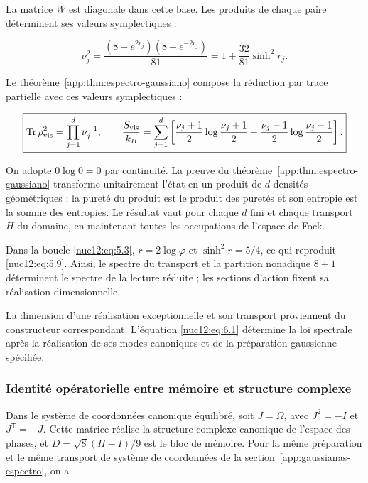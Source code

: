 La matrice \(W\) est diagonale dans cette base. Les produits de chaque paire déterminent ses valeurs symplectiques :




\begin{equation}
\boxed{\nu_j^2=
\frac{(8+e^{2r_j})(8+e^{-2r_j})}{81}
=1+\frac{32}{81}\sinh^2r_j.}
\label{nuc12:eq:6.1}
\end{equation}



Le théorème~\ref{app:thm:espectro-gaussiano} compose la réduction par trace partielle avec ces valeurs symplectiques :



\begin{equation}
\boxed{\operatorname{Tr}\rho_{\rm vis}^2=\prod_{j=1}^d\nu_j^{-1},
\qquad
\frac{S_{\rm vis}}{k_B}=\sum_{j=1}^d
\left[\frac{\nu_j+1}{2}\log\frac{\nu_j+1}{2}
-\frac{\nu_j-1}{2}\log\frac{\nu_j-1}{2}\right].}
\label{nuc12:eq:6.2}
\end{equation}



On adopte \(0\log0=0\) par continuité. La preuve du théorème~\ref{app:thm:espectro-gaussiano} transforme unitairement l’état en un produit de \(d\) densités géométriques : la pureté du produit est le produit des puretés et son entropie est la somme des entropies. Le résultat vaut pour chaque \(d\) fini et chaque transport \(H\) du domaine, en maintenant toutes les occupations de l’espace de Fock.

Dans la boucle \eqref{nuc12:eq:5.3}, \(r=2\log\varphi\) et \(\sinh^2r=5/4\), ce qui reproduit \eqref{nuc12:eq:5.9}. Ainsi, le spectre du transport et la partition nonadique \(8+1\) déterminent le spectre de la lecture réduite ; les sections d’action fixent sa réalisation dimensionnelle.

La dimension d’une réalisation exceptionnelle et son transport proviennent du constructeur correspondant. L’équation \eqref{nuc12:eq:6.1} détermine la loi spectrale après la réalisation de ses modes canoniques et de la préparation gaussienne spécifiée.


\subsubsection{Identité opératorielle entre mémoire et structure complexe
}

Dans le système de coordonnées canonique équilibré, soit \(J=\Omega\), avec \(J^2=-I\) et \(J^{\mathsf T}=-J\). Cette matrice réalise la structure complexe canonique de l’espace des phases, et \(D=\sqrt8(H-I)/9\) est le bloc de mémoire. Pour la même préparation et le même transport de système de coordonnées de la section~\ref{app:gaussianas-espectro}, on a



